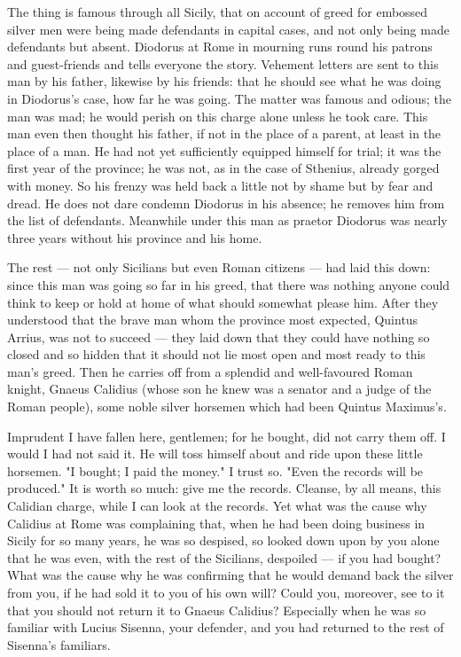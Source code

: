  The thing is famous through all Sicily, that on account of greed for embossed silver men were being made defendants in capital cases, and not only being made defendants but absent. Diodorus at Rome in mourning runs round his patrons and guest-friends and tells everyone the story. Vehement letters are sent to this man by his father, likewise by his friends: that he should see what he was doing in Diodorus's case, how far he was going. The matter was famous and odious; the man was mad; he would perish on this charge alone unless he took care. This man even then thought his father, if not in the place of a parent, at least in the place of a man. He had not yet sufficiently equipped himself for trial; it was the first year of the province; he was not, as in the case of Sthenius, already gorged with money. So his frenzy was held back a little not by shame but by fear and dread. He does not dare condemn Diodorus in his absence; he removes him from the list of defendants. Meanwhile under this man as praetor Diodorus was nearly three years without his province and his home.

 The rest --- not only Sicilians but even Roman citizens --- had laid this down: since this man was going so far in his greed, that there was nothing anyone could think to keep or hold at home of what should somewhat please him. After they understood that the brave man whom the province most expected, Quintus Arrius, was not to succeed --- they laid down that they could have nothing so closed and so hidden that it should not lie most open and most ready to this man's greed. Then he carries off from a splendid and well-favoured Roman knight, Gnaeus Calidius (whose son he knew was a senator and a judge of the Roman people), some noble silver horsemen which had been Quintus Maximus's.

 Imprudent I have fallen here, gentlemen; for he bought, did not carry them off. I would I had not said it. He will toss himself about and ride upon these little horsemen. "I bought; I paid the money." I trust so. "Even the records will be produced." It is worth so much: give me the records. Cleanse, by all means, this Calidian charge, while I can look at the records. Yet what was the cause why Calidius at Rome was complaining that, when he had been doing business in Sicily for so many years, he was so despised, so looked down upon by you alone that he was even, with the rest of the Sicilians, despoiled --- if you had bought? What was the cause why he was confirming that he would demand back the silver from you, if he had sold it to you of his own will? Could you, moreover, see to it that you should not return it to Gnaeus Calidius? Especially when he was so familiar with Lucius Sisenna, your defender, and you had returned to the rest of Sisenna's familiars.

